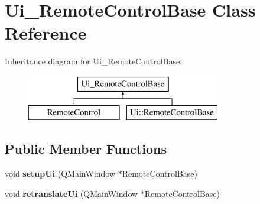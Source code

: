 \hypertarget{classUi__RemoteControlBase}{
\section{Ui\_\-RemoteControlBase Class Reference}
\label{classUi__RemoteControlBase}
}
Inheritance diagram for Ui\_\-RemoteControlBase:\begin{figure}[H]
\begin{center}
\leavevmode
\includegraphics[height=2.000000cm]{classUi__RemoteControlBase}
\end{center}
\end{figure}
\subsection*{Public Member Functions}
\begin{DoxyCompactItemize}
\item 
\hypertarget{classUi__RemoteControlBase_a7e31492ea788e2dade87c5a7a7a6588d}{
void {\bfseries setupUi} (QMainWindow $\ast$RemoteControlBase)}
\label{classUi__RemoteControlBase_a7e31492ea788e2dade87c5a7a7a6588d}

\item 
\hypertarget{classUi__RemoteControlBase_a65cefa04f294fef13843e044f3bd57f5}{
void {\bfseries retranslateUi} (QMainWindow $\ast$RemoteControlBase)}
\label{classUi__RemoteControlBase_a65cefa04f294fef13843e044f3bd57f5}

\end{DoxyCompactItemize}
